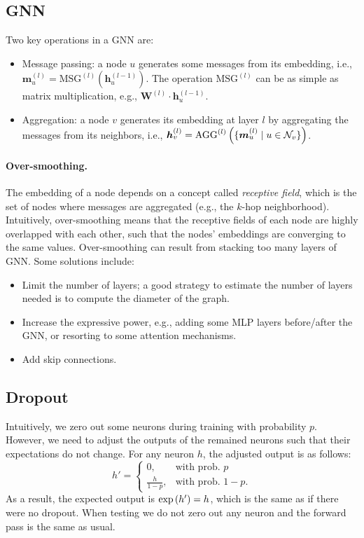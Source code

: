     \subsection{GNN}
        Two key operations in a GNN are:
        \begin{itemize}
            \item Message passing: a node $u$ generates some messages from its embedding, i.e., $\bm{m}_u^{(l)} = \text{MSG}^{(l)}(\bm{h}_u^{(l-1)})$. The operation $\text{MSG}^{(l)}$ can be as simple as matrix multiplication, e.g., $\bm{W}^{(l)} \cdot \bm{h}^{(l-1)}_u$.
            \item Aggregation: a node $v$ generates its embedding at layer $l$ by aggregating the messages from its neighbors, i.e., $\bm{h}_v^{(l)} = \text{AGG}^{(l)}\left( \{ \bm{m}_u^{(l)}  \mid u \in \mathcal{N}_v \} \right)$.
        \end{itemize}
        
        \paragraph{Over-smoothing.} The embedding of a node depends on a concept called \emph{receptive field}, which is the set of nodes where messages are aggregated (e.g., the $k$-hop neighborhood).
        Intuitively, over-smoothing means that the receptive fields of each node are highly overlapped with each other, such that the nodes' embeddings are converging to the same values.
        Over-smoothing can result from stacking too many layers of GNN.
        Some solutions include:
            \begin{itemize}
                \item Limit the number of layers; a good strategy to estimate the number of layers needed is to compute the diameter of the graph.
                \item Increase the expressive power, e.g., adding some MLP layers before/after the GNN, or resorting to some attention mechanisms.
                \item Add skip connections.
            \end{itemize}
            
            
\subsection{Dropout}
    Intuitively, we zero out some neurons during training with probability $p$.
    However, we need to adjust the outputs of the remained neurons such that their expectations do not change.
    For any neuron $h$, the adjusted output is as follows:
        \begin{equation}
            h' = \begin{cases}
                    0, & \text{with prob. $p$} \\
                    \frac{h}{1-p}, & \text{with prob. $1-p$}.
                 \end{cases}
        \end{equation}
    As a result, the expected output is $ \text{exp}\left( h' \right)  = h$, which is the same as if there were no dropout.
    When testing we do not zero out any neuron and the forward pass is the same as usual.
    
